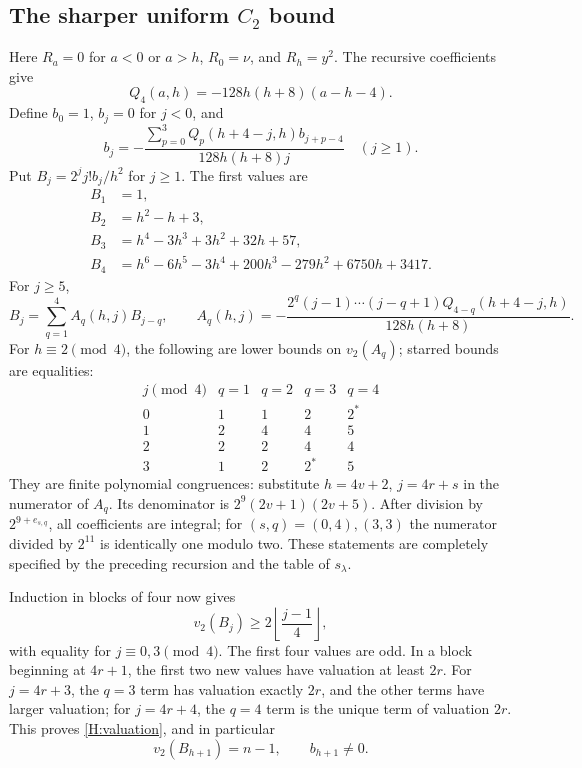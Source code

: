 \documentclass[11pt]{article}
\numberwithin{equation}{section}
\begin{document}
\subsection{The sharper uniform \texorpdfstring{$C_2$}{C2} bound}
Here $R_a=0$ for $a<0$ or $a>h$, $R_0=\nu$, and $R_h=y^2$. The recursive coefficients give
\[
Q_4(a,h)=-128h(h+8)(a-h-4).
\]
Define $b_0=1$, $b_j=0$ for $j<0$, and
\begin{equation}\label{H:backward}
b_j=-\frac{\sum_{p=0}^3Q_p(h+4-j,h)b_{j+p-4}}{128h(h+8)j}
\quad(j\geq1).
\end{equation}
Put $B_j=2^j j!b_j/h^2$ for $j\geq1$. The first values are
\begin{align*}
B_1&=1,\\
B_2&=h^2-h+3,\\
B_3&=h^4-3h^3+3h^2+32h+57,\\
B_4&=h^6-6h^5-3h^4+200h^3-279h^2+6750h+3417.
\end{align*}
For $j\geq5$,
\[
B_j=\sum_{q=1}^4A_q(h,j)B_{j-q},\qquad
A_q(h,j)=-\frac{2^q(j-1)\cdots(j-q+1)Q_{4-q}(h+4-j,h)}{128h(h+8)}.
\]
For $h\equiv2\pmod4$, the following are lower bounds on $v_2(A_q)$; starred bounds are equalities:
\[
\begin{array}{c|rrrr}
j\pmod4&q=1&q=2&q=3&q=4\\\hline
0&1&1&2&2^*\\
1&2&4&4&5\\
2&2&2&4&4\\
3&1&2&2^*&5
\end{array}
\]
They are finite polynomial congruences: substitute $h=4v+2$, $j=4r+s$ in the numerator of $A_q$. Its denominator is $2^9(2v+1)(2v+5)$. After division by $2^{9+e_{s,q}}$, all coefficients are integral; for $(s,q)=(0,4),(3,3)$ the numerator divided by $2^{11}$ is identically one modulo two. These statements are completely specified by the preceding recursion and the table of $s_\lambda$.

Induction in blocks of four now gives
\begin{equation}\label{H:valuation}
v_2(B_j)\geq2\left\lfloor\frac{j-1}{4}\right\rfloor,
\end{equation}
with equality for $j\equiv0,3\pmod4$. The first four values are odd. In a block beginning at $4r+1$, the first two new values have valuation at least $2r$. For $j=4r+3$, the $q=3$ term has valuation exactly $2r$, and the other terms have larger valuation; for $j=4r+4$, the $q=4$ term is the unique term of valuation $2r$. This proves \eqref{H:valuation}, and in particular
\[
v_2(B_{h+1})=n-1,\qquad b_{h+1}\ne0.
\]
\end{document}
